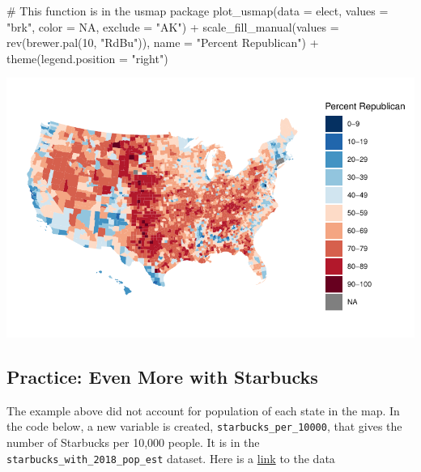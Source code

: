 \documentclass[
  letterpaper,
  DIV=11,
  numbers=noendperiod]{scrreprt}
\newenvironment{Shaded}{\begin{snugshade}}{\end{snugshade}}
\newcommand{\AttributeTok}[1]{\textcolor[rgb]{0.40,0.45,0.13}{#1}}
\newcommand{\CommentTok}[1]{\textcolor[rgb]{0.37,0.37,0.37}{#1}}
\newcommand{\ConstantTok}[1]{\textcolor[rgb]{0.56,0.35,0.01}{#1}}
\newcommand{\DecValTok}[1]{\textcolor[rgb]{0.68,0.00,0.00}{#1}}
\newcommand{\FunctionTok}[1]{\textcolor[rgb]{0.28,0.35,0.67}{#1}}
\newcommand{\NormalTok}[1]{\textcolor[rgb]{0.00,0.23,0.31}{#1}}
\newcommand{\SpecialCharTok}[1]{\textcolor[rgb]{0.37,0.37,0.37}{#1}}
\newcommand{\StringTok}[1]{\textcolor[rgb]{0.13,0.47,0.30}{#1}}
\begin{document}
\begin{Shaded}
\begin{Highlighting}[]
\CommentTok{\# This function is in the usmap package}
\FunctionTok{plot\_usmap}\NormalTok{(}\AttributeTok{data =}\NormalTok{ elect, }\AttributeTok{values =} \StringTok{"brk"}\NormalTok{, }\AttributeTok{color =} \ConstantTok{NA}\NormalTok{, }\AttributeTok{exclude =} \StringTok{"AK"}\NormalTok{) }\SpecialCharTok{+}
  \FunctionTok{scale\_fill\_manual}\NormalTok{(}\AttributeTok{values =} \FunctionTok{rev}\NormalTok{(}\FunctionTok{brewer.pal}\NormalTok{(}\DecValTok{10}\NormalTok{, }\StringTok{"RdBu"}\NormalTok{)), }\AttributeTok{name =} \StringTok{"Percent Republican"}\NormalTok{) }\SpecialCharTok{+} \FunctionTok{theme}\NormalTok{(}\AttributeTok{legend.position =} \StringTok{"right"}\NormalTok{)}
\end{Highlighting}
\end{Shaded}

\includegraphics{src/06-Spatial_Viz_files/figure-pdf/unnamed-chunk-18-1.pdf}

\subsection*{Practice: Even More with
Starbucks}\label{practice-even-more-with-starbucks}

The example above did not account for population of each state in the
map. In the code below, a new variable is created,
\texttt{starbucks\_per\_10000}, that gives the number of Starbucks per
10,000 people. It is in the \texttt{starbucks\_with\_2018\_pop\_est}
dataset. Here is a \href{data/us_census_2018_state_pop_est.csv}{link} to
the data
\end{document}
